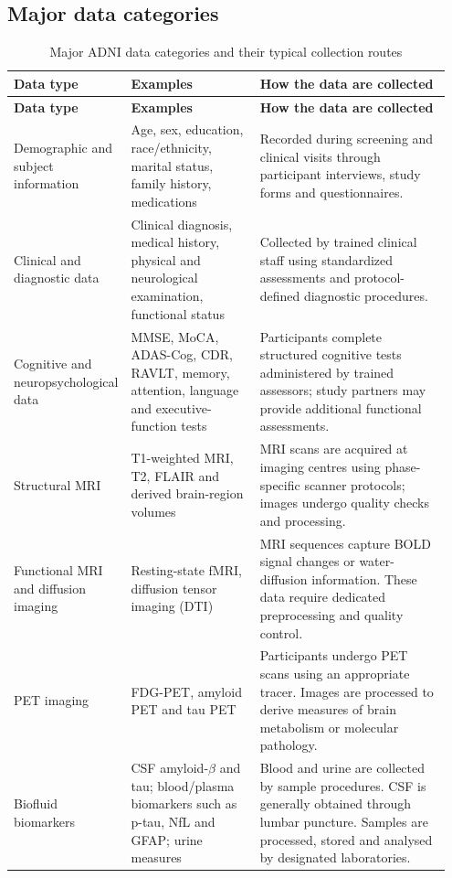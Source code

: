 \documentclass[11pt,a4paper]{article}
\begin{document}
\subsection{Major data categories}
\begingroup\small\renewcommand{\arraystretch}{1.16}
\begin{longtable}{@{}>{\raggedright\arraybackslash}p{0.2\linewidth}>{\raggedright\arraybackslash}p{0.3\linewidth}>{\raggedright\arraybackslash}p{0.45\linewidth}@{}}
\caption{Major ADNI data categories and their typical collection routes \cite{collection,docs}}\\
\toprule \textbf{Data type} & \textbf{Examples} & \textbf{How the data are collected}\\\midrule\endfirsthead
\toprule \textbf{Data type} & \textbf{Examples} & \textbf{How the data are collected}\\\midrule\endhead
\midrule\endfoot\bottomrule\endlastfoot
Demographic and subject information & Age, sex, education, race/ethnicity, marital status, family history, medications & Recorded during screening and clinical visits through participant interviews, study forms and questionnaires.\\
Clinical and diagnostic data & Clinical diagnosis, medical history, physical and neurological examination, functional status & Collected by trained clinical staff using standardized assessments and protocol-defined diagnostic procedures.\\
Cognitive and neuropsychological data & MMSE, MoCA, ADAS-Cog, CDR, RAVLT, memory, attention, language and executive-function tests & Participants complete structured cognitive tests administered by trained assessors; study partners may provide additional functional assessments.\\
Structural MRI & T1-weighted MRI, T2, FLAIR and derived brain-region volumes & MRI scans are acquired at imaging centres using phase-specific scanner protocols; images undergo quality checks and processing.\\
Functional MRI and diffusion imaging & Resting-state fMRI, diffusion tensor imaging (DTI) & MRI sequences capture BOLD signal changes or water-diffusion information. These data require dedicated preprocessing and quality control.\\
PET imaging & FDG-PET, amyloid PET and tau PET & Participants undergo PET scans using an appropriate tracer. Images are processed to derive measures of brain metabolism or molecular pathology.\\
Biofluid biomarkers & CSF amyloid-\ensuremath{\beta} and tau; blood/plasma biomarkers such as p-tau, NfL and GFAP; urine measures & Blood and urine are collected by sample procedures. CSF is generally obtained through lumbar puncture. Samples are processed, stored and analysed by designated laboratories.\\

\end{longtable}
\end{document}

